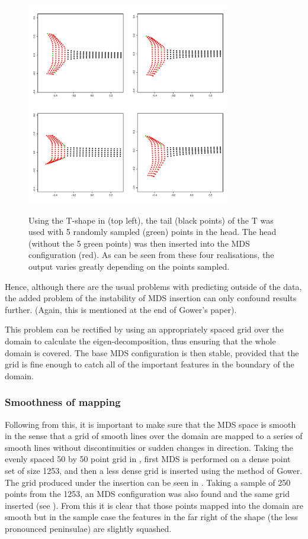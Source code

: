 \begin{figure}
\centering
\includegraphics[width=3.5in]{mds/figs/tshaperand.pdf} \\
\caption{Using the T-shape in  (top left), the tail (black points) of the T was used with 5 randomly sampled (green) points in the head. The head (without the 5 green points) was then inserted into the MDS configuration (red). As can be seen from these four realisations, the output varies greatly depending on the points sampled.}
\label{tshaperand}
\end{figure}

Hence, although there are the usual problems with predicting outside of the data, the added problem of the instability of MDS insertion can only confound results further. (Again, this is mentioned at the end of Gower's paper).

This problem can be rectified by using an appropriately spaced grid over the domain to calculate the eigen-decomposition, thus ensuring that the whole domain is covered. The base MDS configuration is then stable, provided that the grid is fine enough to catch all of the important features in the boundary of the domain.

\subsubsection{Smoothness of mapping}
\label{mds-smoothness}

Following from this, it is important to make sure that the MDS space is smooth in the sense that a grid of smooth lines over the domain are mapped to a series of smooth lines without discontinuities or sudden changes in direction. Taking the evenly spaced 50 by 50 point grid in , first MDS is performed on a dense point set of size 1253, and then a less dense grid is inserted using the method of Gower. The grid produced under the insertion can be seen in . Taking a sample of 250 points from the 1253, an MDS configuration was also found and the same grid inserted (see ). From this it is clear that those points mapped into the domain are smooth but in the sample case the features in the far right of the shape (the less pronounced peninsulae) are slightly squashed.

